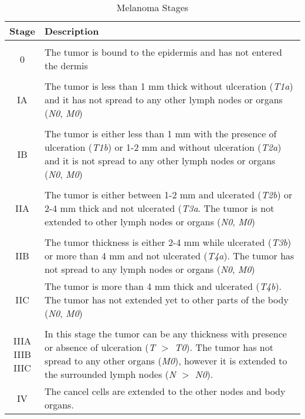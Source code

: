 	\begin{table}
	\small
	\caption{Melanoma Stages\cite{balch2009final}}
	\begin{center}
		\begin{tabular}{|c|p{8cm}|}
		\hline
		 Stage & Description \\ \hline
		 & \\
		 0 &  The tumor is bound to the epidermis and has not entered the dermis\\
		 & \\
		 IA & The tumor is less than 1 mm thick without ulceration (\textit{T1a}) and it has not spread to any other lymph nodes or organs (\textit{N0}, \textit{M0})\\
		  & \\
	     IB & The tumor is either less than 1 mm with the presence of ulceration (\textit{T1b}) or 1-2 mm and without ulceration (\textit{T2a}) and it is not spread to any other lymph nodes or organs (\textit{N0}, \textit{M0})\\
		 & \\
         IIA & The tumor is either between 1-2 mm and ulcerated (\textit{T2b}) or 2-4 mm thick and not ulcerated (\textit{T3a}. The tumor is not extended to other lymph nodes or organs (\textit{N0}, \textit{M0})\\
		 & \\
		 IIB & The tumor thickness is either 2-4 mm while ulcerated (\textit{T3b}) or more than 4 mm and not ulcerated (\textit{T4a}). The tumor has not spread to any lymph nodes or organs (\textit{N0}, \textit{M0})\\
		 IIC & The tumor is more than 4 mm thick and ulcerated (\textit{T4b}). The tumor has not extended yet to other parts of the body (\textit{N0}, \textit{M0})\\
		 & \\
         \pbox{2cm}{IIIA\\IIIB\\IIIC} & In this stage the tumor can be any thickness with presence or absence of ulceration (\textit{T $>$ T0}). The tumor has not spread to any other organs (\textit{M0}), however it is extended to the surrounded lymph nodes (\textit{N $>$ N0}).\\
         IV &  The cancel cells are extended to the other nodes and body organs. \\
 
         \hline
				  
		\end{tabular}
    \end{center}
	\label{T:Melanoma Sataging}	
	\end{table}	 
  
